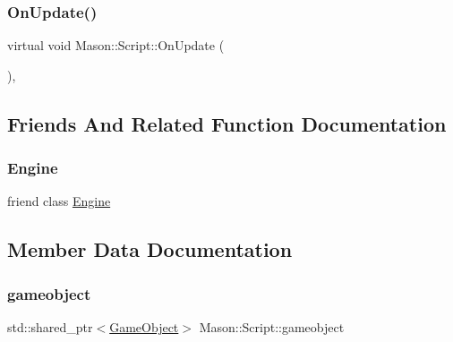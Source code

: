 \subsubsection{\texorpdfstring{On\+Update()}{OnUpdate()}}
{\footnotesize\ttfamily virtual void Mason\+::\+Script\+::\+On\+Update (\begin{DoxyParamCaption}{ }\end{DoxyParamCaption})\hspace{0.3cm}{\ttfamily [inline]}, {\ttfamily [virtual]}}



\subsection{Friends And Related Function Documentation}
\hypertarget{class_mason_1_1_script_a3e1914489e4bed4f9f23cdeab34a43dc}{}\label{class_mason_1_1_script_a3e1914489e4bed4f9f23cdeab34a43dc} 
\subsubsection{\texorpdfstring{Engine}{Engine}}
{\footnotesize\ttfamily friend class \hyperlink{class_mason_1_1_engine}{Engine}\hspace{0.3cm}{\ttfamily [friend]}}



\subsection{Member Data Documentation}
\hypertarget{class_mason_1_1_script_a26ffab9ad2a0f22cb6a3cba3029a985f}{}\label{class_mason_1_1_script_a26ffab9ad2a0f22cb6a3cba3029a985f} 
\subsubsection{\texorpdfstring{gameobject}{gameobject}}
{\footnotesize\ttfamily std\+::shared\+\_\+ptr$<$\hyperlink{class_mason_1_1_game_object}{Game\+Object}$>$ Mason\+::\+Script\+::gameobject}

\hypertarget{class_mason_1_1_script_a39ec15b6842f815f09537f524c0b0786}{}\label{class_mason_1_1_script_a39ec15b6842f815f09537f524c0b0786} 
